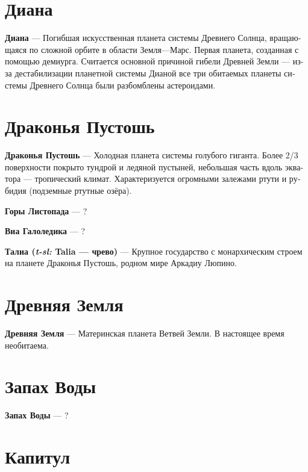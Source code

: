 \documentclass[a4paper,12pt,fleqn]{book}\usepackage{cooltooltips}\usepackage{polyglossia}\setdefaultlanguage[babelshorthands=true]{russian}\setotherlanguage{english}\defaultfontfeatures{Ligatures=TeX,Mapping=tex-text} \usepackage{xcolor}\definecolor{lightgray}{HTML}{bbbbbb}\color{lightgray}\newcommand{\ml}[3]{\textenglish{\textcolor{black}{#3}}}
\newcommand{\asterism}{\vspace{1em}{\centering\Large\bfseries$\ast~\ast~\ast$\par}\vspace{1em}}
\newcommand{\theterm}[3]{\textbf{\hypertarget{#1}{#2}} --- #3}
\newcommand{\theorigin}[3]{\textit{#1:} #2 --- #3}
\begin{document}
\section{Диана}

\theterm{diana}
{Диана}
{Погибшая искусственная планета системы Древнего Солнца, вращающаяся по сложной орбите в области Земля---Марс.
Первая планета, созданная с помощью демиурга.
Считается основной причиной гибели Древней Земли --- из-за дестабилизации планетной системы Дианой все три обитаемых планеты системы Древнего Солнца были разбомблены астероидами.}

\section{Драконья Пустошь}

\theterm{drake-desert}
{Драконья Пустошь}
{Холодная планета системы голубого гиганта.
Более 2/3 поверхности покрыто тундрой и ледяной пустыней, небольшая часть вдоль экватора --- тропический климат.
Характеризуется огромными залежами ртути и рубидия (подземные ртутные озёра).}

\asterism

\theterm{dropleaf-mountains}
{Горы Листопада}
{?}

\theterm{via-galoledica}
{Виа Галоледика}
{?}

\theterm{talia}
{Талиа (\theorigin{t-sl}{Talia}{чрево})}
{Крупное государство с монархическим строем на планете Драконья Пустошь, родном мире Аркадиу Люпино.}

\section{Древняя Земля}

\theterm{old-earth}
{Древняя Земля}
{Материнская планета Ветвей Земли.
В настоящее время необитаема.}

\section{Запах Воды}

\theterm{smellwater}
{Запах Воды}
{?}

\section{Капитул}
\end{document}
